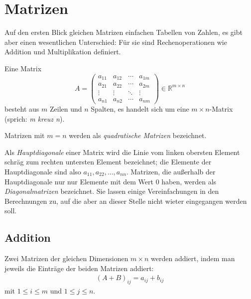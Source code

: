 

\section{Matrizen}
Auf den ersten Blick gleichen Matrizen einfachen Tabellen von Zahlen, es gibt aber einen wesentlichen Unterschied: Für sie sind Rechenoperationen wie Addition und Multiplikation definiert.

Eine Matrix
\begin{equation}
 A = \begin{pmatrix}
   a_{11} & a_{12} & \cdots & a_{1m}\\
   a_{21} & a_{22} & \cdots & a_{2m}\\
   \vdots & \vdots & \ddots & \vdots\\
   a_{n1} & a_{n2} & \cdots & a_{nm}
 \end{pmatrix}
 \in \mathbb{R}^{m \times n}
\end{equation}
besteht aus $m$ Zeilen und $n$ Spalten, es handelt sich um eine $m \times n$-Matrix (sprich: \emph{m kreuz n}).

Matrizen mit $m = n$ werden als \emph{quadratische Matrizen} bezeichnet.

Als \emph{Hauptdiagonale} einer Matrix wird die Linie vom linken obersten Element schräg zum rechten untersten Element bezeichnet; die Elemente der Hauptdiagonale sind also $a_{11}, a_{22}, \ldots, a_{nn}$. Matrizen, die außerhalb der Hauptdiagonale nur nur Elemente mit dem Wert 0 haben, werden als \emph{Diagonalmatrizen} bezeichnet. Sie lassen einige Vereinfachungen in den Berechnungen zu, auf die aber an dieser Stelle nicht wieter eingegangen werden soll.


\subsection{Addition}
Zwei Matrizen der gleichen Dimensionen $m \times n$ werden addiert, indem man jeweils die Einträge der beiden Matrizen addiert:
\begin{align}
 (A + B)_{ij} = a_{ij} + b_{ij}%
\end{align}
mit $1 \leq i \leq m$ und $1 \leq j \leq n$.

